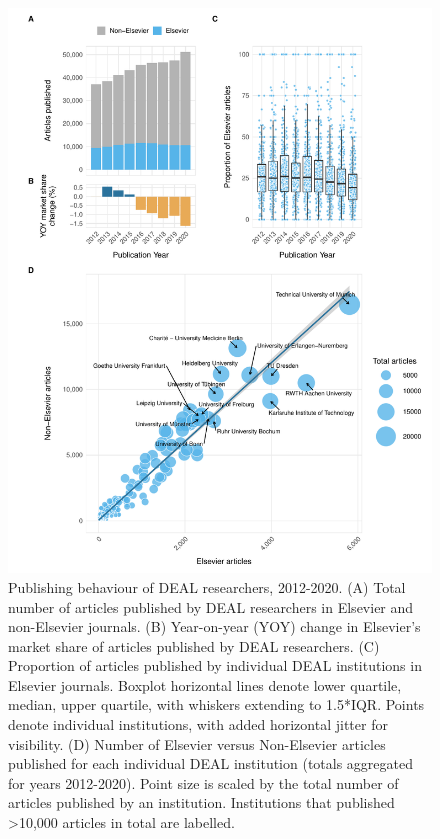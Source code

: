 \documentclass[
]{article}
\begin{document}
\begin{figure}

{\centering \includegraphics[width=0.75\linewidth]{analysis_files/figure-latex/items-publisher-year-1} 

}

\caption{Publishing behaviour of DEAL researchers, 2012-2020. (A) Total number of articles published by DEAL researchers in Elsevier and non-Elsevier journals. (B) Year-on-year (YOY) change in Elsevier's market share of articles published by DEAL researchers. (C) Proportion of articles published by individual DEAL institutions in Elsevier journals. Boxplot horizontal lines denote lower quartile, median, upper quartile, with whiskers extending to 1.5*IQR. Points denote individual institutions, with added horizontal jitter for visibility. (D) Number of Elsevier versus Non-Elsevier articles published for each individual DEAL institution (totals aggregated for years 2012-2020). Point size is scaled by the total number of articles published by an institution. Institutions that published >10,000 articles in total are labelled.}\label{fig:items-publisher-year}
\end{figure}
\end{document}
